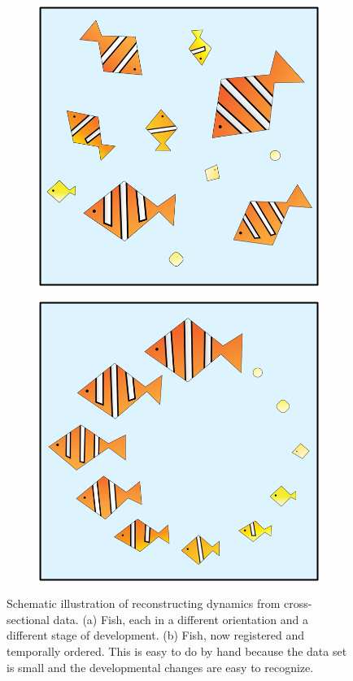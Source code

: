 \documentclass{pnastwo}
\begin{document}
\begin{figure}
\begin{subfigure}{0.25\textwidth}
\includegraphics[width=\textwidth]{fish1}
\caption{}
\end{subfigure}
\begin{subfigure}{0.25\textwidth}
\includegraphics[width=\textwidth]{fish2}
\caption{}
\end{subfigure}
\caption{Schematic illustration of reconstructing dynamics from cross-sectional data. (a) Fish, each in a different orientation and a different stage of development. (b) Fish, now registered and temporally ordered. This is easy to do by hand because the data set is small and the developmental changes are easy to recognize.} 
\label{fig:fish}
\end{figure}
\end{document}
